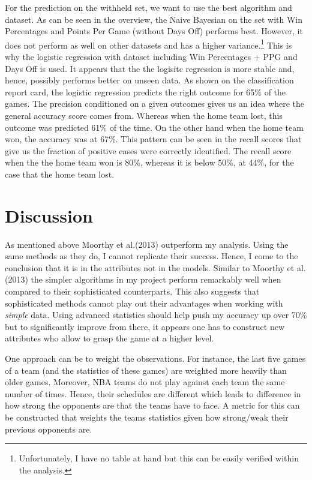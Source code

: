\documentclass[11pt,a4paper,leqno]{article}
\begin{document}
For the prediction on the withheld set, we want to use the best algorithm and dataset. As can be seen in the overview, the Naive Bayesian on the set with Win Percentages and Points Per Game (without Days Off) performs best. However, it does not perform as well on other datasets and has a higher variance.\footnote{Unfortunately, I have no table at hand but this can be easily verified within the analysis.} This is why the logistic regression with dataset including Win Percentages + PPG and Days Off is used. It appears that the the logisitc regression is more stable and, hence, possibly performs better on unseen data.  As shown on the classification report card, the logistic regression predicts the right outcome for 65\% of the games. The precision conditioned on a given outcomes gives us an idea where the general accuracy score comes from. Whereas when the home team lost, this outcome was predicted 61\% of the time. On the other hand when the home team won, the accuracy was at 67\%. This pattern can be seen in the recall scores that give us the fraction of positive cases were correctly identified. The recall score when the the home team won is 80\%, whereas it is below 50\%, at 44\%, for the case that the home team lost.

\section{Discussion}

As mentioned above Moorthy et al.(2013) outperform my analysis. Using the same methods as they do, I cannot replicate their success.  Hence, I come to the conclusion that it is in the attributes not in the models. Similar to Moorthy et al.(2013) the simpler algorithms in my project perform remarkably well when compared to their sophisticated counterparts. This also suggests that sophisticated methods cannot play out their advantages when working with \textit{simple} data. Using advanced statistics should help push my accuracy up over 70\% but to significantly improve from there, it appears one has to construct new attributes who allow to grasp the game at a higher level.

One approach can be to weight the observations. For instance, the last five games of a team (and the statistics of these games) are weighted more heavily than older games. Moreover, NBA teams do not play against each team the same number of times. Hence, their schedules are different which leads to difference in how strong the opponents are that the teams have to face. A metric for this can be constructed that weights the teams statistics given how strong/weak their previous opponents are.
\end{document}
